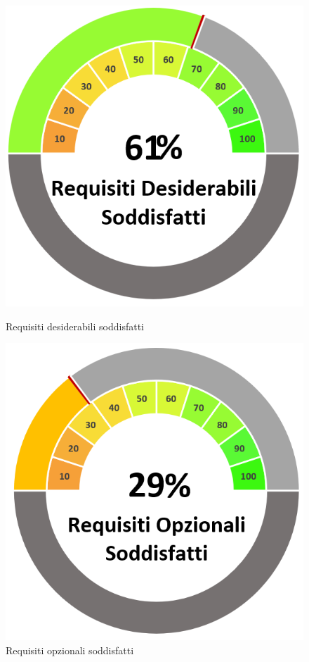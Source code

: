 \begin{figure}[H]
\begin{minipage}[b]{0.32\textwidth}
        \includegraphics[width=\textwidth]{ReqDesSodd.png}
        \caption{Requisiti desiderabili soddisfatti}
        \label{reqdessodd}
    \end{minipage}
    \hfill
    \begin{minipage}[b]{0.32\textwidth}
        \centering
        \includegraphics[width=\textwidth]{ReqOpzSodd.png}
        \caption{Requisiti opzionali soddisfatti}
        \label{reqopzsodd}
    \end{minipage}
\end{figure}
